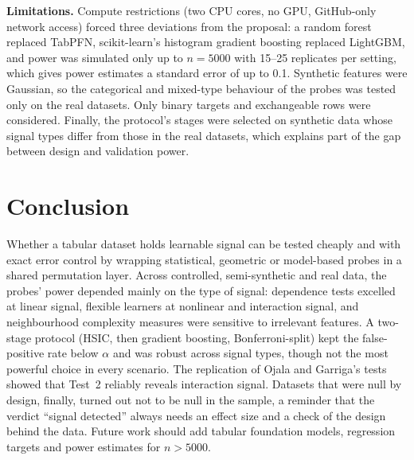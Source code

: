 

\textbf{Limitations.} Compute restrictions (two CPU cores, no GPU, GitHub-only network access) forced three deviations from the proposal: a random forest replaced TabPFN, scikit-learn's histogram gradient boosting replaced LightGBM, and power was simulated only up to $n=5000$ with 15--25 replicates per setting, which gives power estimates a standard error of up to 0.1. Synthetic features were Gaussian, so the categorical and mixed-type behaviour of the probes was tested only on the real datasets. Only binary targets and exchangeable rows were considered. Finally, the protocol's stages were selected on synthetic data whose signal types differ from those in the real datasets, which explains part of the gap between design and validation power.

\section{Conclusion}
\label{sec:conclusion}

Whether a tabular dataset holds learnable signal can be tested cheaply and with exact error control by wrapping statistical, geometric or model-based probes in a shared permutation layer. Across controlled, semi-synthetic and real data, the probes' power depended mainly on the type of signal: dependence tests excelled at linear signal, flexible learners at nonlinear and interaction signal, and neighbourhood complexity measures were sensitive to irrelevant features. A two-stage protocol (HSIC, then gradient boosting, Bonferroni-split) kept the false-positive rate below $\alpha$ and was robust across signal types, though not the most powerful choice in every scenario. The replication of Ojala and Garriga's tests showed that Test~2 reliably reveals interaction signal. Datasets that were null by design, finally, turned out not to be null in the sample, a reminder that the verdict ``signal detected'' always needs an effect size and a check of the design behind the data. Future work should add tabular foundation models, regression targets and power estimates for $n>5000$.
